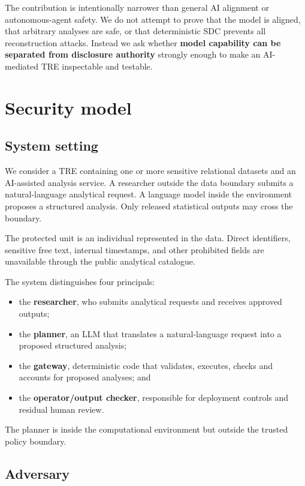 \documentclass[11pt,a4paper]{article}
\begin{document}
The contribution is intentionally narrower than general AI alignment or
autonomous-agent safety. We do not attempt to prove that the model is aligned,
that arbitrary analyses are safe, or that deterministic SDC prevents all
reconstruction attacks. Instead we ask whether \textbf{model capability can be
separated from disclosure authority} strongly enough to make an AI-mediated
TRE inspectable and testable.

\section{Security model}
\label{sec:security}

\subsection{System setting}

We consider a TRE containing one or more sensitive relational datasets and an
AI-assisted analysis service. A researcher outside the data boundary submits a
natural-language analytical request. A language model inside the environment
proposes a structured analysis. Only released statistical outputs may cross the
boundary.

The protected unit is an individual represented in the data. Direct
identifiers, sensitive free text, internal timestamps, and other prohibited
fields are unavailable through the public analytical catalogue.

The system distinguishes four principals:

\begin{itemize}[leftmargin=*]
  \item the \textbf{researcher}, who submits analytical requests and receives
  approved outputs;
  \item the \textbf{planner}, an LLM that translates a natural-language request
  into a proposed structured analysis;
  \item the \textbf{gateway}, deterministic code that validates, executes,
  checks and accounts for proposed analyses; and
  \item the \textbf{operator/output checker}, responsible for deployment
  controls and residual human review.
\end{itemize}

The planner is inside the computational environment but outside the trusted
policy boundary.

\subsection{Adversary}
\end{document}
